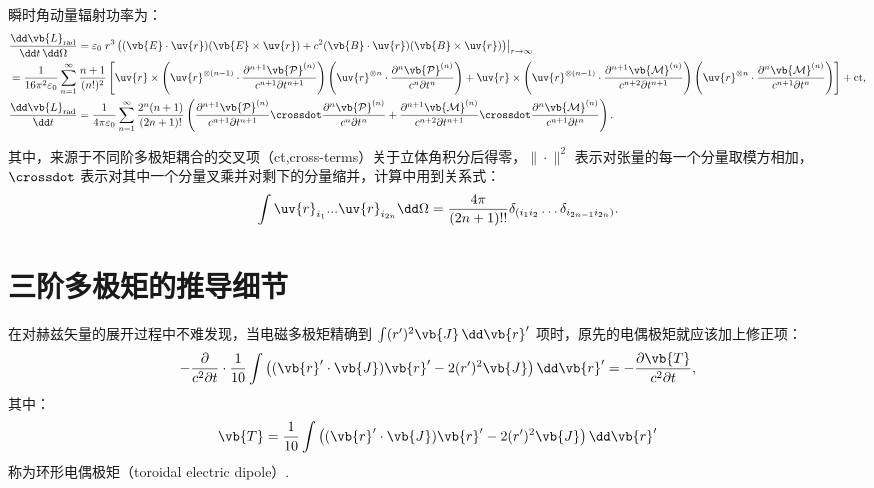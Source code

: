 瞬时角动量辐射功率为：
\small
\begin{align*}
	&\frac{\dd  \vb{L}_{\text{rad}}}{\dd t \, \dd \Omega} = \varepsilon_0\left. r^3 \left( (\vb{E} \cdot \uv{r})(\vb{E} \times \uv{r}) + c^2 (\vb{B} \cdot \uv{r})(\vb{B} \times \uv{r}) \right) \right|_{r \to \infty} \\
	&= \frac{1}{16\pi^2 \varepsilon_0} \sum_{n=1}^{\infty} \frac{n+1}{(n!)^2} \left[ \uv{r} \times \left( \uv{r}^{\otimes (n-1)} \cdot \frac{\partial^{n+1} \vb{\mathcal{P}}^{(n)}}{c^{n+1} \partial t^{n+1}} \right) \left( \uv{r}^{\otimes n} \cdot \frac{\partial^n \vb{\mathcal{P}}^{(n)}}{c^n \partial t^n} \right) + \uv{r} \times \left( \uv{r}^{\otimes (n-1)} \cdot \frac{\partial^{n+1} \vb{\mathcal{M}}^{(n)}}{c^{n+2} \partial t^{n+1}} \right) \left( \uv{r}^{\otimes n} \cdot \frac{\partial^n \vb{\mathcal{M}}^{(n)}}{c^{n+1} \partial t^n} \right) \right] +\text{ct}, \\
	&\frac{\dd  \vb{L}_{\text{rad}}}{\dd t} = \frac{1}{4\pi \varepsilon_0} \sum_{n=1}^{\infty} \frac{2^n (n+1)}{(2n+1)!} \left( \frac{\partial^{n+1} \vb{\mathcal{P}}^{(n)}}{c^{n+1} \partial t^{n+1}} \crossdot \frac{\partial^n \vb{\mathcal{P}}^{(n)}}{c^n \partial t^n} + \frac{\partial^{n+1} \vb{\mathcal{M}}^{(n)}}{c^{n+2} \partial t^{n+1}} \crossdot \frac{\partial^n \vb{\mathcal{M}}^{(n)}}{c^{n+1} \partial t^n} \right).
\end{align*}
\normalsize

其中，来源于不同阶多极矩耦合的交叉项（ct,cross-terms）关于立体角积分后得零，\(\|\cdot\|^2\) 表示对张量的每一个分量取模方相加，\(\crossdot\) 表示对其中一个分量叉乘并对剩下的分量缩并，计算中用到关系式：
\begin{align*}
	\int \uv{r}_{i_1} ... \uv{r}_{i_{2n}} \dd \Omega = \frac{4\pi}{(2n+1)!!} \delta_{(i_1 i_2} \dots \delta_{i_{2n-1} i_{2n})}.
\end{align*}

\section{三阶多极矩的推导细节}
在对赫兹矢量的展开过程中不难发现，当电磁多极矩精确到 \(\int (r')^2 \vb{J} \, \dd \vb{r}'\) 项时，原先的电偶极矩就应该加上修正项：
\begin{align*}
	-\frac{\partial}{c^2 \partial t} \cdot \frac{1}{10} \int \left( (\vb{r}' \cdot \vb{J}) \vb{r}' - 2 (r')^2 \vb{J} \right) \dd \vb{r}' = -\frac{\partial \vb{T}}{c^2 \partial t},
\end{align*}
其中：
\begin{align*}
	\vb{T} = \frac{1}{10} \int \left( (\vb{r}' \cdot \vb{J}) \vb{r}' - 2 (r')^2 \vb{J} \right) \dd \vb{r}'
\end{align*}
称为环形电偶极矩（toroidal electric dipole）.

